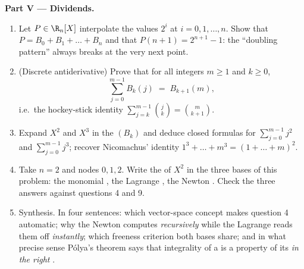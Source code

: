 \begin{problem}
\medskip
\noindent\textbf{Part V --- Dividends.}
\begin{enumerate}[resume]
  \item Let $P \in \R_n[X]$ interpolate the values $2^i$ at $i =
        0, 1, \dots, n$. Show that $P = B_0 + B_1 + \dots + B_n$
        and that $P(n + 1) = 2^{n+1} - 1$: the ``doubling
        pattern'' always breaks at the very next point.
  \item (Discrete antiderivative) Prove that for all integers $m
        \geq 1$ and $k \geq 0$,
        \[
        \sum_{j=0}^{m-1} B_k(j) \;=\; B_{k+1}(m),
        \]
        i.e.\ the hockey-stick identity $\sum_{j=k}^{m-1}
        \binom{j}{k} = \binom{m}{k+1}$.
  \item Expand $X^2$ and $X^3$ in the  $(B_k)$ and deduce
        closed formulas for $\sum_{j=0}^{m-1} j^2$ and
        $\sum_{j=0}^{m-1} j^3$; recover Nicomachus' identity
        $1^3 + \dots + m^3 = (1 + \dots + m)^2$.
  \item Take $n = 2$ and nodes $0, 1, 2$. Write the  of
        $X^2$ in the three bases of this problem: the monomial
        , the Lagrange , the Newton . Check the
        three answers against questions 4 and 9.
  \item Synthesis. In four sentences: which vector-space concept
        makes question 4 automatic; why the Newton  computes
         \emph{recursively} while the Lagrange 
        reads them off \emph{instantly}; which freeness criterion
        both bases share; and in what precise sense P\'olya's
        theorem says that integrality of a  is a
        property of its  \emph{in the right }.
\end{enumerate}
\end{problem}
